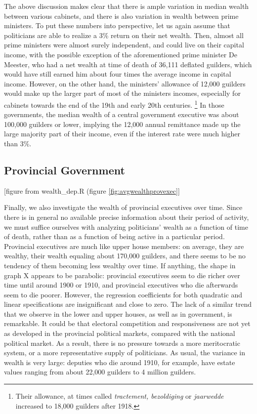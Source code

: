     The above discussion makes clear that there is ample variation in median wealth between various cabinets, and there is also variation in wealth between prime ministers. To put these numbers into perspective, let us again assume that politicians are able to realize a 3\% return on their net wealth. Then, almost all prime ministers were almost surely independent, and could live on their capital income, with the possible exception of the aforementioned prime minister De Meester, who had a net wealth at time of death of 36,111 deflated guilders, which would have still earned him about four times the average income in capital income. However, on the other hand, the ministers' allowance of 12,000 guilders would make up the larger part of most of the ministers incomes, especially for cabinets towards the end of the 19th and early 20th centuries. \autocite{berg1999ongelijkheid} \footnote{Their allowance, at times called \textit{tractement, bezoldiging} or \textit{jaarwedde} increased to 18,000 guilders after 1918.}  In those governments, the median wealth of a central government executive was about 100,000 guilders or lower, implying the 12,000 annual remittance made up the large majority part of their income, even if the interest rate were much higher than 3\%.
    
\subsection{Provincial Government}
\begin{center}    
    [figure from wealth\_dep.R (figure \ref{fig:avgwealthprovexec}]
 \end{center}   
    Finally, we also investigate the wealth of provincial executives over time. Since there is in general no available precise information about their period of activity, we must suffice ourselves with analyzing politicians' wealth as a function of time of death, rather than as a function of being active in a particular period. Provincial executives are much like upper house members: on average, they are wealthy, their wealth equaling about 170,000 guilders, and there seems to be no tendency of them becoming less wealthy over time. If anything, the shape in graph X appears to be parabolic: provincial executives seem to die richer over time until around 1900 or 1910, and provincial executives who die afterwards seem to die poorer. However, the regression coefficients for both quadratic and linear specifications are insignificant and close to zero. The lack of a similar trend that we observe in the lower and upper houses, as well as in government, is remarkable. It could be that electoral competition and responsiveness are not yet as developed in the provincial political markets, compared with the national political market. As a result, there is no pressure towards a more meritocratic system, or a more representative supply of politicians. As usual, the variance in wealth is very large: deputies who die around 1910, for example, have estate values ranging from about 22,000 guilders to 4 million guilders. 
    
